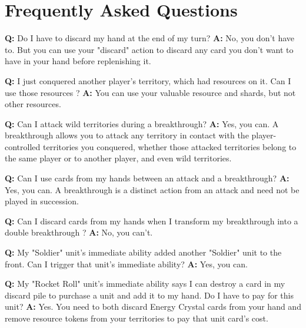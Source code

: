 \documentclass[a4paper]{article}
\begin{document}
\newpage
\section{Frequently Asked Questions}

    \hspace{-2em}
    \textbf{Q:} Do I have to discard my hand at the end of my turn?
    \newline
    \textbf{A:} No, you don't have to. But you can use your "discard" action to discard
    any card you don't want to have in your hand before replenishing it.

    \hspace{-2em}
    \textbf{Q:} I just conquered another player's territory, which had resources on it.
    Can I use those resources ?
    \newline
    \textbf{A:} You can use your valuable resource and shards, but not other resources.

    \hspace{-2em}
    \textbf{Q:} Can I attack wild territories during a breakthrough?
    \newline
    \textbf{A:} Yes, you can. A breakthrough allows you to attack any territory in contact
    with the player-controlled territories you conquered, whether those attacked
    territories belong to the same player or to another player, and even wild territories.

    \hspace{-2em}
    \textbf{Q:} Can I use cards from my hands between an attack and a breakthrough?
    \newline
    \textbf{A:} Yes, you can. A breakthrough is a distinct action from an attack and
    need not be played in succession.

    \hspace{-2em}
    \textbf{Q:} Can I discard cards from my hands when I transform my breakthrough into
    a double breakthrough ?
    \newline
    \textbf{A:} No, you can't.

    \hspace{-2em}
    \textbf{Q:} My "Soldier" unit's immediate ability added another "Soldier"
    unit to the front. Can I trigger that unit's immediate ability?
    \newline
    \textbf{A:} Yes, you can.

    \hspace{-2em}
    \textbf{Q:} My "Rocket Roll" unit's immediate ability says I can destroy a card
    in my discard pile to purchase a unit and add it to my hand.
    Do I have to pay for this unit?
    \newline
    \textbf{A:} Yes. You need to both discard Energy Crystal cards from your hand
    and remove resource tokens from your territories to pay that unit card's cost.
    
\end{document}
